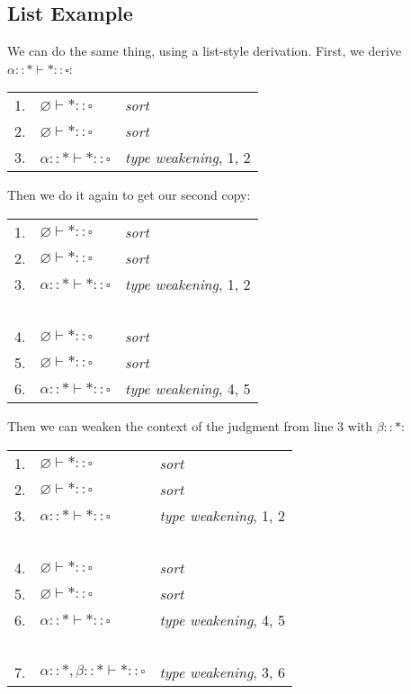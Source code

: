 \documentclass{book}
\numberwithin{equation}{chapter}
\begin{document}
\subsection{List Example}

We can do the same thing, using a list-style derivation. First, we derive $\alpha :: \ast \vdash \ast :: \square$:

\begin{center}
\begin{tabular}[t]{l l l}
1. & $\varnothing \vdash \ast :: \square$ & \textit{sort} \\
2. & $\varnothing \vdash \ast :: \square$ & \textit{sort} \\
3. & $\alpha :: \ast \vdash \ast :: \square$ & \textit{type weakening}, 1, 2
\end{tabular}
\end{center}

\noindent
Then we do it again to get our second copy:

\begin{center}
\begin{tabular}[t]{l l l}
1. & $\varnothing \vdash \ast :: \square$ & \textit{sort} \\
2. & $\varnothing \vdash \ast :: \square$ & \textit{sort} \\
3. & $\alpha :: \ast \vdash \ast :: \square$ & \textit{type weakening}, 1, 2 \\
~ & ~ & \\
4. & $\varnothing \vdash \ast :: \square$ & \textit{sort} \\
5. & $\varnothing \vdash \ast :: \square$ & \textit{sort} \\
6. & $\alpha :: \ast \vdash \ast :: \square$ & \textit{type weakening}, 4, 5
\end{tabular}
\end{center}

\noindent
Then we can weaken the context of the judgment from line 3 with $\beta :: \ast$:

\begin{center}
\begin{tabular}[t]{l l l}
1. & $\varnothing \vdash \ast :: \square$ & \textit{sort} \\
2. & $\varnothing \vdash \ast :: \square$ & \textit{sort} \\
3. & $\alpha :: \ast \vdash \ast :: \square$ & \textit{type weakening}, 1, 2 \\
~ & ~ & \\
4. & $\varnothing \vdash \ast :: \square$ & \textit{sort} \\
5. & $\varnothing \vdash \ast :: \square$ & \textit{sort} \\
6. & $\alpha :: \ast \vdash \ast :: \square$ & \textit{type weakening}, 4, 5 \\
~ & ~ & \\
7. & $\alpha :: \ast, \beta :: \ast \vdash \ast :: \square$ & \textit{type weakening}, 3, 6
\end{tabular}
\end{center}
\end{document}
